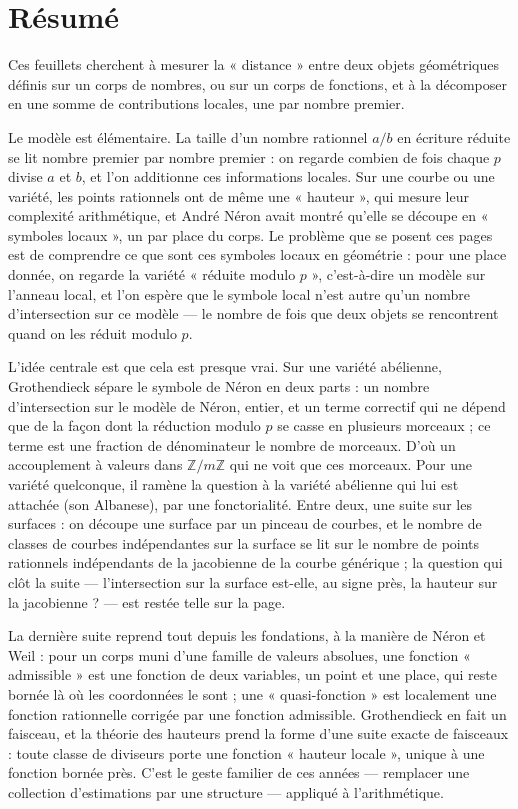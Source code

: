 \documentclass[11pt,a4paper]{article}
\begin{document}
\section*{Résumé}

\begin{resume}
Ces feuillets cherchent à mesurer la « distance » entre deux objets
géométriques définis sur un corps de nombres, ou sur un corps de fonctions,
et à la décomposer en une somme de contributions locales, une par nombre
premier.

Le modèle est élémentaire. La taille d'un nombre rationnel $a/b$ en
écriture réduite se lit nombre premier par nombre premier : on regarde
combien de fois chaque $p$ divise $a$ et $b$, et l'on additionne ces
informations locales. Sur une courbe ou une variété, les points rationnels
ont de même une « hauteur », qui mesure leur complexité arithmétique, et
André Néron avait montré qu'elle se découpe en « symboles locaux », un par
place du corps. Le problème que se posent ces pages est de comprendre ce
que sont ces symboles locaux en géométrie : pour une place donnée, on
regarde la variété « réduite modulo $p$ », c'est-à-dire un modèle sur
l'anneau local, et l'on espère que le symbole local n'est autre qu'un
nombre d'intersection sur ce modèle — le nombre de fois que deux objets se
rencontrent quand on les réduit modulo $p$.

L'idée centrale est que cela est presque vrai. Sur une variété abélienne,
Grothendieck sépare le symbole de Néron en deux parts : un nombre
d'intersection sur le modèle de Néron, entier, et un terme correctif qui
ne dépend que de la façon dont la réduction modulo $p$ se casse en
plusieurs morceaux ; ce terme est une fraction de dénominateur le nombre
de morceaux. D'où un accouplement à valeurs dans $\mathbb{Z}/m\mathbb{Z}$
qui ne voit que ces morceaux. Pour une variété quelconque, il ramène la
question à la variété abélienne qui lui est attachée (son Albanese), par
une fonctorialité. Entre deux, une suite sur les surfaces : on découpe
une surface par un pinceau de courbes, et le nombre de classes de courbes
indépendantes sur la surface se lit sur le nombre de points rationnels
indépendants de la jacobienne de la courbe générique ; la question qui
clôt la suite — l'intersection sur la surface est-elle, au signe près, la
hauteur sur la jacobienne ? — est restée telle sur la page.

La dernière suite reprend tout depuis les fondations, à la manière de
Néron et Weil : pour un corps muni d'une famille de valeurs absolues, une
fonction « admissible » est une fonction de deux variables, un point et
une place, qui reste bornée là où les coordonnées le sont ; une
« quasi-fonction » est localement une fonction rationnelle corrigée par
une fonction admissible. Grothendieck en fait un faisceau, et la
théorie des hauteurs prend la forme d'une suite exacte de faisceaux :
toute classe de diviseurs porte une fonction « hauteur locale », unique à
une fonction bornée près. C'est le geste familier de ces années —
remplacer une collection d'estimations par une structure — appliqué à
l'arithmétique.


\end{resume}
\end{document}
